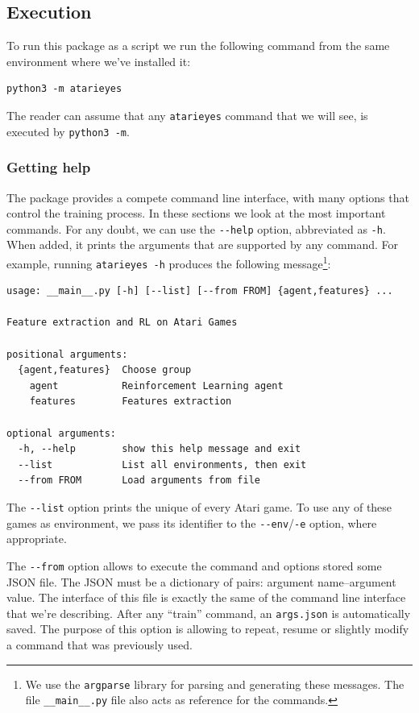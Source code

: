 \subsection{Execution}

To run this package as a script we run the following command from the same
environment where we've installed it:
\begin{verbatim}
python3 -m atarieyes
\end{verbatim}
The reader can assume that any \texttt{atarieyes} command that we will see, is
executed by \verb|python3 -m|.

\subsubsection*{Getting help}

The package provides a compete command line interface, with many options that
control the training process. In these sections we look at the most important
commands. For any doubt, we can use the \verb|--help| option, abbreviated
as \verb|-h|. When added, it prints the arguments that are supported by any
command. For example, running \verb|atarieyes -h|
produces the following message\footnote{We use the
\texttt{argparse} library for parsing and generating these messages. The file
\texttt{\_\_main\_\_.py} file also acts as reference for the commands.}:
\begin{verbatim}
usage: __main__.py [-h] [--list] [--from FROM] {agent,features} ...

Feature extraction and RL on Atari Games

positional arguments:
  {agent,features}  Choose group
    agent           Reinforcement Learning agent
    features        Features extraction

optional arguments:
  -h, --help        show this help message and exit
  --list            List all environments, then exit
  --from FROM       Load arguments from file
\end{verbatim}

The \verb|--list| option prints the unique of every Atari game. To use any of
these games as environment, we pass its identifier to the
\verb|--env|/\texttt{-e} option, where appropriate.

The \verb|--from| option allows to execute the command and options stored some
JSON file. The JSON must be a dictionary of pairs: argument name--argument
value. The interface of this file is exactly the same of the command line
interface that we're describing. After any ``train'' command, an
\verb|args.json| is automatically saved. The purpose of this option is
allowing to repeat, resume or slightly modify a command that was previously
used.

